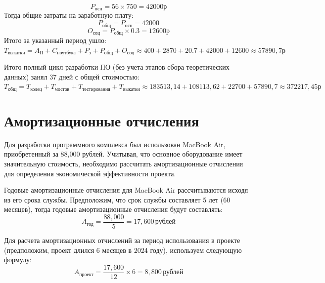 \documentclass[a4paper,14pt,russian]{extreport}
\renewcommand{\_}{\kern-1.5pt\textunderscore\kern-1.5pt}
\begin{document}
		\begin{equation*}
			P_{\text{осн}} = 56 \times 750 = 42000 \text{р}
		\end{equation*}
		Тогда общие затраты на заработную плату:
		\begin{equation*}
			P_{\text{общ}} = P_{\text{осн}}= 42000
		\end{equation*}
		\begin{equation*}
			O_{\text{соц}} = P_{\text{общ}} \times 0.3 = 12600 \text{р}
		\end{equation*}
		Итого за указанный период ушло:
		\\
		$T_{\text{выкатки}} = A_{\text{П}} + C_{\text{ноутбука}} + P_{\text{э}} + P_{\text{общ}} + 	O_{\text{соц}} \approx 400 + 2870 + 20.7 + 42000 + 12600 \approx 57 890,7 \text{р} $
	\par Итого полный цикл разработки ПО (без учета этапов сбора теоретических данных) занял 37 дней с общей стоимостью:
	$T_{\text{общ}} = T_{\text{колец}} + T_{\text{мостов}} + T_{\text{тестирования}} + 	T_{\text{выкатки}} \approx 183513,14 + 108113,62 + 22700 + 57890,7 \approx 372 217,45 \text{р}$
\section{Амортизационные отчисления}
\par Для разработки программного комплекса был использован MacBook Air, приобретенный за 88,000 рублей. Учитывая, что основное оборудование имеет значительную стоимость, необходимо рассчитать амортизационные отчисления для определения экономической эффективности проекта.

\par Годовые амортизационные отчисления для MacBook Air рассчитываются исходя из его срока службы. Предположим, что срок службы составляет 5 лет (60 месяцев), тогда годовые амортизационные отчисления будут составлять:
\begin{equation*}
    A_{\text{год}} = \frac{88,000}{5} = 17,600 \, \text{рублей}
\end{equation*}

\par Для расчета амортизационных отчислений за период использования в проекте (предположим, проект длился 6 месяцев в 2024 году), используем следующую формулу:
\begin{equation*}
    A_{\text{проект}} = \frac{17,600}{12} \times 6 = 8,800 \, \text{рублей}
\end{equation*}
\end{document}
